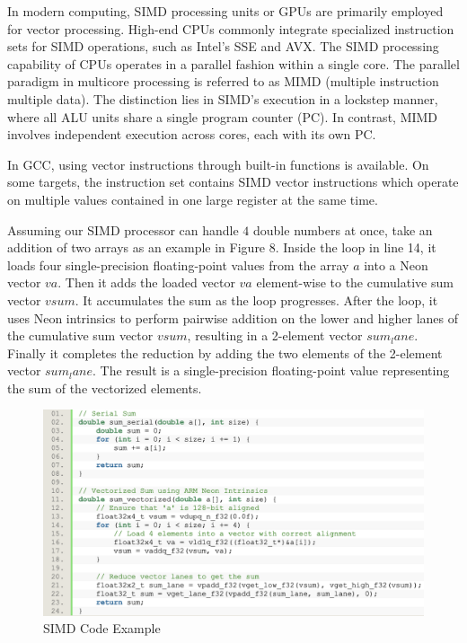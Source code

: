 \documentclass[conference]{IEEEtran}
\begin{document}
In modern computing, SIMD processing units or GPUs are primarily employed for vector processing. High-end CPUs commonly integrate specialized instruction sets for SIMD operations, such as Intel's SSE and AVX. The SIMD processing capability of CPUs operates in a parallel fashion within a single core. The parallel paradigm in multicore processing is referred to as MIMD (multiple instruction multiple data). The distinction lies in SIMD's execution in a lockstep manner, where all ALU units share a single program counter (PC). In contrast, MIMD involves independent execution across cores, each with its own PC.

In GCC, using vector instructions through built-in functions is available. On some targets, the instruction set contains SIMD vector instructions which operate on multiple values contained in one large register at the same time.\cite{b6}

Assuming our SIMD processor can handle $4$ double numbers at once, take an addition of two arrays as an example in Figure 8. Inside the loop in line 14, it loads four single-precision floating-point values from the array $a$ into a Neon vector $va$. Then it adds the loaded vector $va$ element-wise to the cumulative sum vector $vsum$. It accumulates the sum as the loop progresses. After the loop, it uses Neon intrinsics to perform pairwise addition on the lower and higher lanes of the cumulative sum vector $vsum$, resulting in a 2-element vector $sum_lane$. Finally it completes the reduction by adding the two elements of the 2-element vector $sum_lane$. The result is a single-precision floating-point value representing the sum of the vectorized elements.

\begin{figure}[htbp]
\centering
\includegraphics [width=0.95\linewidth]{pictures/SIMD_code.png}
\caption{SIMD Code Example}
\label{fig8}
\end{figure}
\end{document}
